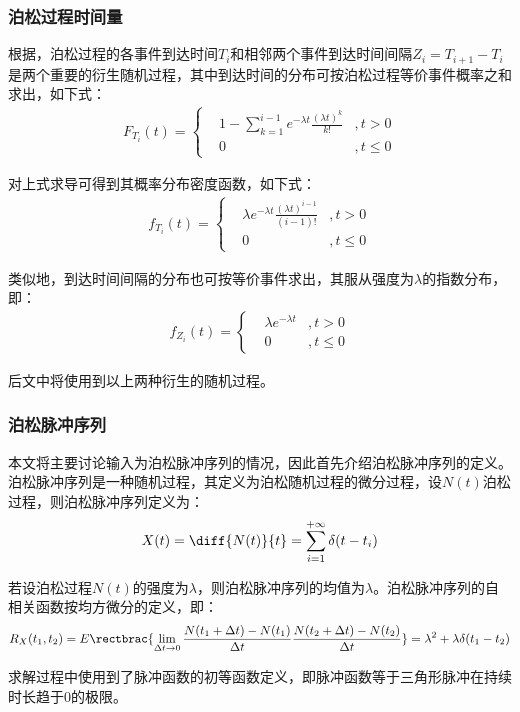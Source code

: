 \documentclass[11pt]{article}
\begin{document}
\subsubsection{泊松过程时间量}
根据\cite{ZhouYinQingSuiJiGuoChengLiLun2013}，泊松过程的各事件到达时间$T_i$和相邻两个事件到达时间间隔$Z_i=T_{i+1}-T_i$是两个重要的衍生随机过程，其中到达时间的分布可按泊松过程等价事件概率之和求出，如下式：
\begin{align}
  F_{T_i}(t)=\left\{
  \begin{aligned}
     & 1-\sum\limits_{k=1}^{i-1}e^{-\lambda t}\frac{(\lambda t)^k}{k!} & , t>0    \\
     & 0                                                               & , t\le 0
  \end{aligned}
  \right.
  \label{eq:到达时间概率分布函数}
\end{align}\par
对上式求导可得到其概率分布密度函数，如下式：
\begin{align}
  f_{T_i}(t)=\left\{
  \begin{aligned}
     & \lambda e^{-\lambda t}\frac{(\lambda t)^{i-1}}{(i-1)!} & ,t>0     \\
     & 0                                                      & , t\le 0
  \end{aligned}
  \right.
  \label{eq:到达时间概率密度函数}
\end{align}\par
类似地，到达时间间隔的分布也可按等价事件求出，其服从强度为$\lambda$的指数分布，即：
\begin{align}
  f_{Z_i}(t)=\left\{
  \begin{aligned}
     & \lambda e^{-\lambda t} & ,t>0    \\
     & 0                      & ,t\le 0
  \end{aligned}
  \right.
  \label{eq:到达时间间隔概率密度函数}
\end{align}\par
后文中将使用到以上两种衍生的随机过程。
\subsubsection{泊松脉冲序列}
本文将主要讨论输入为泊松脉冲序列的情况，因此首先介绍泊松脉冲序列的定义。泊松脉冲序列是一种随机过程，其定义为泊松随机过程的微分过程\cite{ZhouYinQingSuiJiGuoChengLiLun2013}，设$N(t)$泊松过程，则泊松脉冲序列定义为：
\begin{align}
  X(t)=\diff{N(t)}{t}=\sum\limits_{i=1}^{+\infty}\delta(t-t_i)
  \label{eq:泊松脉冲序列定义}
\end{align}\par
若设泊松过程$N(t)$的强度为$\lambda$，则泊松脉冲序列的均值为$\lambda$。泊松脉冲序列的自相关函数按均方微分的定义，即：
\begin{align}
  R_X(t_1,t_2)=E\rectbrac{\lim_{\Delta t\to 0}\frac{N(t_1+\Delta t)-N(t_1)}{\Delta t}\frac{N(t_2+\Delta t)-N(t_2)}{\Delta t}}=\lambda^2+\lambda\delta(t_1-t_2)
  \label{eq:泊松脉冲序列自相关函数}
\end{align}\par
求解过程中使用到了脉冲函数的初等函数定义，即脉冲函数等于三角形脉冲在持续时长趋于0的极限。
\end{document}
